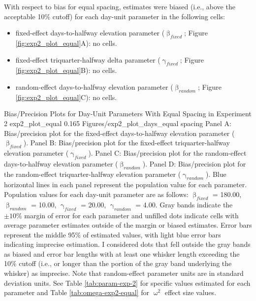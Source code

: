 \documentclass[
12pt, %
twoside,
english]{guelphthesis}
\begin{document}
With respect to bias for equal spacing, estimates were biased (i.e., above the acceptable 10\% cutoff) for each day-unit parameter in the following cells:
\begin{itemize}
\tightlist
\item
  fixed-effect days-to-halfway elevation parameter (\(\upbeta_{fixed}\); Figure \ref{fig:exp2_plot_equal}A): no cells.
\item
  fixed-effect triquarter-halfway delta parameter (\(\upgamma_{fixed}\); Figure \ref{fig:exp2_plot_equal}B): no cells.
\item
  random-effect days-to-halfway elevation parameter (\(\upbeta_{random}\); Figure \ref{fig:exp2_plot_equal}C): no cells.
\end{itemize}
\begin{apaFigure}
[portrait]
[samepage]
[-0.2cm]
{Bias/Precision Plots for Day-Unit Parameters With Equal Spacing in Experiment 2}
{exp2_plot_equal}
{0.165}
{Figures/exp2_plot_days_equal spacing}
{Panel A: Bias/precision plot for the fixed-effect days-to-halfway elevation parameter ($\upbeta_{fixed}$). Panel B: Bias/precision plot for the fixed-effect triquarter-halfway elevation parameter ($\upgamma_{fixed}$). Panel C: Bias/precision plot for the random-effect days-to-halfway elevation parameter ($\upbeta_{random}$). Panel D: Bias/precision plot for the random-effect triquarter-halfway elevation parameter ($\upgamma_{random}$). Blue horizontal lines in each panel represent the population value for each parameter. Population values for each day-unit parameter are as follows: $\upbeta_{fixed}$ = 180.00, $\upbeta_{random}$ = 10.00, $\upgamma_{fixed}$ = 20.00, $\upgamma_{random}$ = 4.00. Gray bands indicate the $\pm 10\%$ margin of error for each parameter and unfilled dots indicate cells with average parameter estimates outside of the margin or biased estimates. Error bars represent the middle 95\% of estimated values, with light blue error bars indicating imprecise estimation. I considered dots that fell outside the gray bands as biased and error bar lengths with at least one whisker length exceeding the 10\% cutoff (i.e., or longer than the portion of the gray band underlying the whisker) as imprecise. Note that random-effect parameter units are in standard deviation units. See Table \ref{tab:param-exp-2} for specific values estimated for each parameter and Table \ref{tab:omega-exp2-equal} for $\upomega^2$ effect size values.}
\end{apaFigure}
\end{document}
